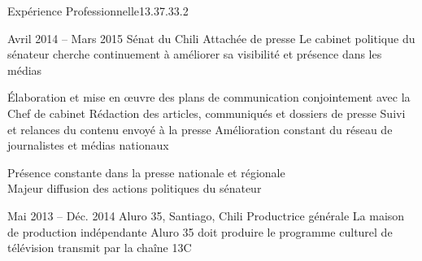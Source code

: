 \documentclass[30pt, french]{tccv}
\begin{document}
\begin{upshape}
\begin{flat_frame}{Expérience Professionnelle}{13.3}{7.3}{3.2}{}
\begin{eventlist}
\setlength{\parskip}{0pt}
\item{\color{text} Avril 2014 -- Mars 2015}
     {Sénat du Chili}
     {Attachée de presse}
     \fontsize{9pt}{1em}\color{text}\bodyfontlight\upshape\selectfont
%
 Le cabinet politique du sénateur  cherche continuement à améliorer sa visibilité et présence dans les médias \\ 

    \setlength{\parskip}{-10pt}
    \begin{itemize}
      \setlength\itemsep{-3pt} 
      \cvitem[\checkmark] Élaboration et mise en œuvre des plans de communication conjointement avec la Chef de cabinet
      \cvitem[\checkmark] Rédaction des articles, communiqués et dossiers de presse
      \cvitem[\checkmark] Suivi et relances du contenu envoyé à la presse
      \cvitem[\checkmark] Amélioration constant du réseau de journalistes et médias nationaux
      
      
      
      
    \end{itemize}     
 Présence constante dans la presse nationale et régionale  \\
\mission{}            Majeur diffusion des actions politiques du sénateur
    
    
    
\setlength{\parskip}{0pt}        
\item{Mai 2013 -- Déc. 2014}
     {Aluro 35, Santiago, Chili}
     {Productrice générale}
     \fontsize{9pt}{1em}\color{text}\bodyfontlight\upshape\selectfont
%
 La maison de production indépendante Aluro 35 doit produire le programme culturel de télévision  transmit par la chaîne 13C \\
    

\end{eventlist}
\end{flat_frame}
\end{upshape}
\end{document}
